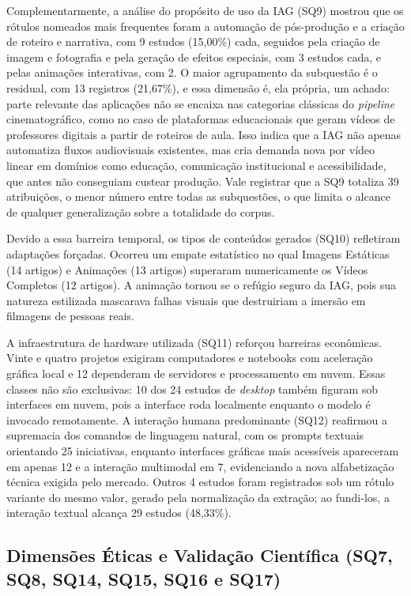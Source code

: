 Complementarmente, a análise do propósito de uso da IAG (SQ9) mostrou que os rótulos nomeados mais frequentes foram a automação de pós-produção e a criação de roteiro e narrativa, com 9 estudos (15,00\%) cada, seguidos pela criação de imagem e fotografia e pela geração de efeitos especiais, com 3 estudos cada, e pelas animações interativas, com 2. O maior agrupamento da subquestão é o residual, com 13 registros (21,67\%), e essa dimensão é, ela própria, um achado: parte relevante das aplicações não se encaixa nas categorias clássicas do \textit{pipeline} cinematográfico, como no caso de plataformas educacionais que geram vídeos de professores digitais a partir de roteiros de aula. Isso indica que a IAG não apenas automatiza fluxos audiovisuais existentes, mas cria demanda nova por vídeo linear em domínios como educação, comunicação institucional e acessibilidade, que antes não conseguiam custear produção. Vale registrar que a SQ9 totaliza 39 atribuições, o menor número entre todas as subquestões, o que limita o alcance de qualquer generalização sobre a totalidade do corpus. 

Devido a essa barreira temporal, os tipos de conteúdos gerados (SQ10) refletiram adaptações forçadas. Ocorreu um empate estatístico no qual Imagens Estáticas (14 artigos) e Animações (13 artigos) superaram numericamente os Vídeos Completos (12 artigos). A animação tornou se o refúgio seguro da IAG, pois sua natureza estilizada mascarava falhas visuais que destruiriam a imersão em filmagens de pessoas reais.

A infraestrutura de hardware utilizada (SQ11) reforçou barreiras econômicas. Vinte e quatro projetos exigiram computadores e notebooks com aceleração gráfica local e 12 dependeram de servidores e processamento em nuvem. Essas classes não são exclusivas: 10 dos 24 estudos de \textit{desktop} também figuram sob interfaces em nuvem, pois a interface roda localmente enquanto o modelo é invocado remotamente. A interação humana predominante (SQ12) reafirmou a supremacia dos comandos de linguagem natural, com os prompts textuais orientando 25 iniciativas, enquanto interfaces gráficas mais acessíveis apareceram em apenas 12 e a interação multimodal em 7, evidenciando a nova alfabetização técnica exigida pelo mercado. Outros 4 estudos foram registrados sob um rótulo variante do mesmo valor, gerado pela normalização da extração; ao fundi-los, a interação textual alcança 29 estudos (48,33\%).

\subsection{Dimensões Éticas e Validação Científica (SQ7, SQ8, SQ14, SQ15, SQ16 e SQ17)}

